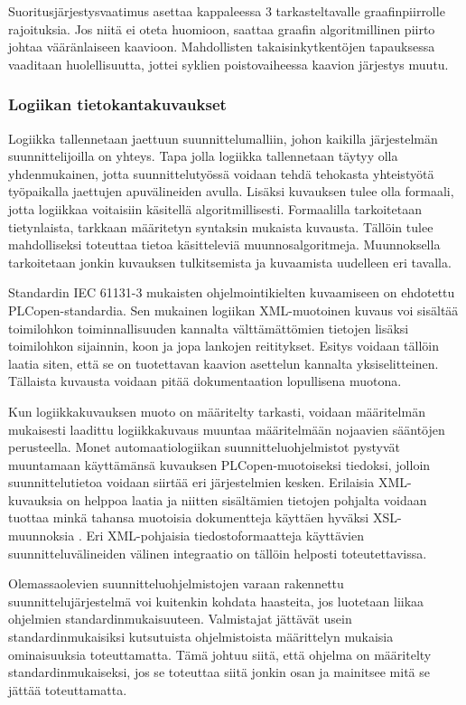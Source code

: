 \documentclass[finnish,12pt]{article}
\begin{document}
Suoritusjärjestysvaatimus asettaa kappaleessa 3 tarkasteltavalle graafinpiirrolle rajoituksia.
Jos niitä ei oteta huomioon, saattaa graafin algoritmillinen piirto johtaa vääränlaiseen kaavioon.
Mahdollisten takaisinkytkentöjen tapauksessa vaaditaan huolellisuutta, jottei syklien poistovaiheessa kaavion järjestys muutu.


		\subsubsection{Logiikan tietokantakuvaukset}

Logiikka tallennetaan jaettuun suunnittelumalliin, johon kaikilla järjestelmän suunnittelijoilla on yhteys.
Tapa jolla logiikka tallennetaan täytyy olla yhdenmukainen, jotta suunnittelutyössä voidaan tehdä tehokasta yhteistyötä työpaikalla jaettujen apuvälineiden avulla.
Lisäksi kuvauksen tulee olla formaali, jotta logiikkaa voitaisiin käsitellä algoritmillisesti.
Formaalilla tarkoitetaan tietynlaista, tarkkaan määritetyn syntaksin mukaista kuvausta.
Tällöin tulee mahdolliseksi toteuttaa tietoa käsitteleviä muunnosalgoritmeja.
Muunnoksella tarkoitetaan jonkin kuvauksen tulkitsemista ja kuvaamista uudelleen eri tavalla.

Standardin IEC 61131-3 mukaisten ohjelmointikielten kuvaamiseen on ehdotettu PLCopen-standardia.
Sen mukainen logiikan XML-muotoinen kuvaus voi sisältää toimilohkon toiminnallisuuden kannalta välttämättömien tietojen lisäksi toimilohkon sijainnin, koon ja jopa lankojen reititykset.
Esitys voidaan tällöin laatia siten, että se on tuotettavan kaavion asettelun kannalta yksiselitteinen.
Tällaista kuvausta voidaan pitää dokumentaation lopullisena muotona. \cite{RefWorks:64}

Kun logiikkakuvauksen muoto on määritelty tarkasti, voidaan määritelmän mukaisesti laadittu logiikkakuvaus muuntaa määritelmään nojaavien sääntöjen perusteella.
Monet automaatiologiikan suunnitteluohjelmistot pystyvät muuntamaan käyttämänsä kuvauksen PLCopen-muotoiseksi tiedoksi, jolloin suunnittelutietoa voidaan siirtää eri järjestelmien kesken.
Erilaisia XML-kuvauksia on helppoa laatia ja niitten sisältämien tietojen pohjalta voidaan tuottaa minkä tahansa muotoisia dokumentteja käyttäen hyväksi XSL-muunnoksia \cite{RefWorks:61}. Eri XML-pohjaisia tiedostoformaatteja käyttävien suunnitteluvälineiden välinen integraatio on tällöin helposti toteutettavissa.

Olemassaolevien suunnitteluohjelmistojen varaan rakennettu suunnittelujärjestelmä voi kuitenkin kohdata haasteita, jos luotetaan liikaa ohjelmien standardinmukaisuuteen.
Valmistajat jättävät usein standardinmukaisiksi kutsutuista ohjelmistoista määrittelyn mukaisia ominaisuuksia toteuttamatta.
Tämä johtuu siitä, että ohjelma on määritelty standardinmukaiseksi, jos se toteuttaa siitä jonkin osan ja mainitsee mitä se jättää toteuttamatta. \cite{RefWorks:42}
\end{document}
